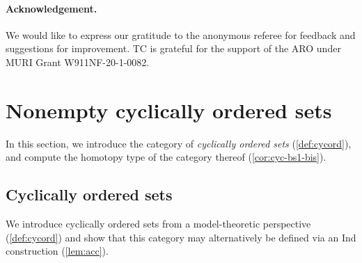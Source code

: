 \documentclass{amsart}
\theoremstyle{plain}
\theoremstyle{definition}
\begin{document}
\paragraph{\bf{Acknowledgement.}} We would like to express our gratitude to the anonymous referee for feedback and suggestions for improvement. TC is grateful for the support of the ARO under MURI Grant W911NF-20-1-0082.

\section{Nonempty cyclically ordered sets}\label{sec:cyc}

In this section, we introduce the category of \emph{cyclically ordered sets} (\cref{def:cycord}), and compute the homotopy type of the category thereof (\cref{cor:cyc-bs1-bis}).

\subsection{Cyclically ordered sets}

We introduce cyclically ordered sets from a model-theoretic perspective (\cref{def:cycord}) and show that this category may alternatively be defined via an Ind construction (\cref{lem:acc}).
\end{document}
